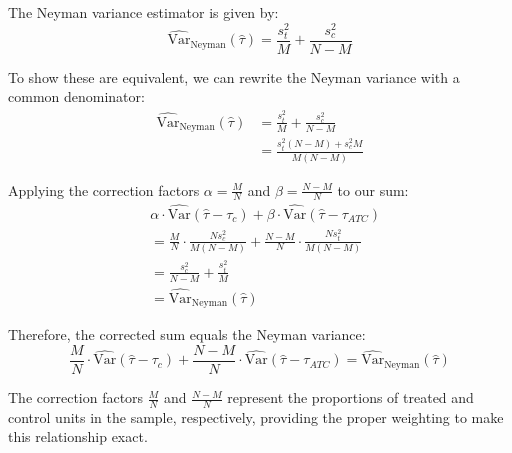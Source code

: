 \documentclass[12pt]{article}
\begin{document}
The Neyman variance estimator is given by:
$$
\widehat{\text{Var}}_{\text{Neyman}}(\hat{\tau}) = \frac{s_t^2}{M} + \frac{s_c^2}{N-M}
$$

To show these are equivalent, we can rewrite the Neyman variance with a common denominator:
\begin{align*}
\widehat{\text{Var}}_{\text{Neyman}}(\hat{\tau}) &= \frac{s_t^2}{M} + \frac{s_c^2}{N-M} \\
&= \frac{s_t^2(N-M) + s_c^2 M}{M(N-M)}
\end{align*}

Applying the correction factors $\alpha = \frac{M}{N}$ and $\beta = \frac{N-M}{N}$ to our sum:
\begin{align*}
&\alpha \cdot \widehat{\text{Var}}(\hat{\tau} - \tau_c) + \beta \cdot \widehat{\text{Var}}(\hat{\tau} - \tau_{ATC}) \\
&= \frac{M}{N} \cdot \frac{N s_c^2}{M(N-M)} + \frac{N-M}{N} \cdot \frac{N s_t^2}{M(N-M)} \\
&= \frac{s_c^2}{N-M} + \frac{s_t^2}{M} \\
&= \widehat{\text{Var}}_{\text{Neyman}}(\hat{\tau})
\end{align*}

Therefore, the corrected sum equals the Neyman variance:
$$
\frac{M}{N} \cdot \widehat{\text{Var}}(\hat{\tau} - \tau_c) + \frac{N-M}{N} \cdot \widehat{\text{Var}}(\hat{\tau} - \tau_{ATC}) = \widehat{\text{Var}}_{\text{Neyman}}(\hat{\tau})
$$

The correction factors $\frac{M}{N}$ and $\frac{N-M}{N}$ represent the proportions of treated and control units in the sample, respectively, providing the proper weighting to make this relationship exact.
\end{document}
